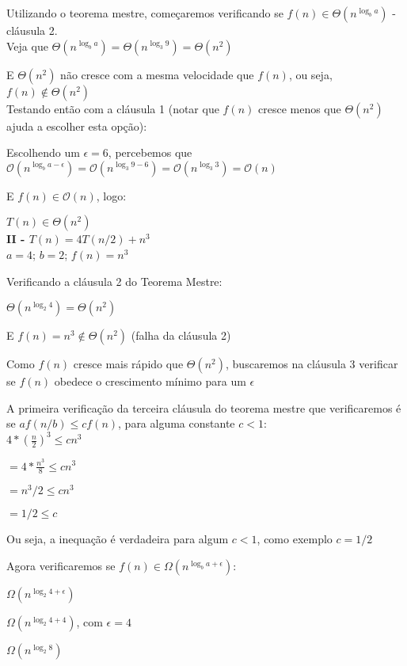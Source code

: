\documentclass[a4paper, twocolumn]{article}
\theoremstyle{definition}
\begin{document}
	Utilizando o teorema mestre, começaremos verificando se $f(n) \in \Theta(n^{\log_b a})$ - cláusula 2. \\

	Veja que $\Theta(n^{\log_b a}) = \Theta(n^{\log_3 9}) = \Theta(n^2)$
	
	E $\Theta(n^2)$ não cresce com a mesma velocidade que $f(n)$, ou seja, $f(n) \notin \Theta(n^2)$ \\
	
	Testando então com a cláusula 1 (notar que $f(n)$ cresce menos que $\Theta(n^2)$ ajuda a escolher esta opção):
	
	Escolhendo um $\epsilon = 6$, percebemos que 
	$\mathcal{O}(n^{\log_b a-\epsilon}) = \mathcal{O}(n^{\log_3 9-6}) = \mathcal{O}(n^{\log_3 3}) = \mathcal{O}(n)$
	
	E $f(n) \in \mathcal{O}(n)$, logo:
	
	$T(n) \in \Theta(n^2)$ \\
	
	
	\textbf{II - $T(n) = 4T(n/2)+ n^3$} \\
	
	$a = 4$;
	$b = 2$;
	$f(n) = n^3$ 
	
	Verificando a cláusula 2 do Teorema Mestre:
	
	$\Theta(n^{\log_2 4}) = \Theta(n^{2})$
	
	E $f(n) = n^3 \notin \Theta(n^{2})$ (falha da cláusula 2)
	
	Como $f(n)$ cresce mais rápido que $\Theta(n^{2})$, buscaremos na cláusula 3 verificar se $f(n)$ obedece o crescimento mínimo para um $\epsilon$
	
	A primeira verificação da terceira cláusula do teorema mestre que verificaremos é se $af(n/b) \leq cf(n)$, para alguma constante $c < 1$: \\
	
	$4*(\frac{n}{2})^3 \leq cn^3$

	$= 4*\frac{n^3}{8} \leq cn^3$

	$= n^3/2 \leq cn^3$

	$= 1/2 \leq c$

	Ou seja, a inequação é verdadeira para algum $c < 1$, como exemplo $c=1/2$
	
	Agora verificaremos se $f(n) \in \Omega(n^{\log_b a + \epsilon})$:
	
	$\Omega(n^{\log_2 4 + \epsilon})$

	$\Omega(n^{\log_2 4 + 4})$, com $\epsilon = 4$

	$\Omega(n^{\log_2 8})$
\end{document}
